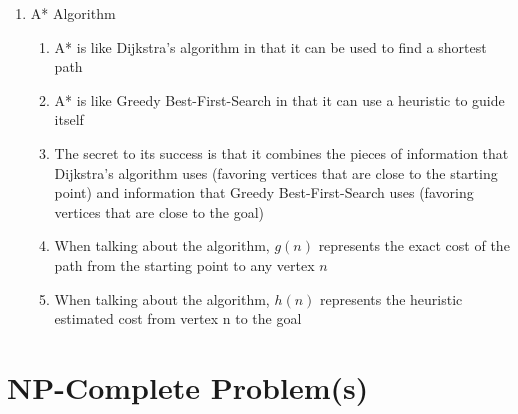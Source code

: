 \documentclass [12pt, executivepaper]{article}
\begin{document}
\begin{enumerate}
\begin{enumerate}
\begin{enumerate}
\end{enumerate}

\item A* Algorithm

\begin{enumerate}

\item A* is like Dijkstra's algorithm in that it can be used to find a shortest path

\item A* is like Greedy Best-First-Search in that it can use a heuristic to guide itself

\item The secret to its success is that it combines the pieces of information that Dijkstra's algorithm uses (favoring vertices that are close to the starting point) and information that Greedy Best-First-Search uses (favoring vertices that are close to the goal)

\item When talking about the algorithm, $g(n)$ represents the exact cost of the path from the starting point to any vertex $n$

\item When talking about the algorithm, $h(n)$ represents the heuristic estimated cost from vertex n to the goal

\end{enumerate}

\end{enumerate}

\end{enumerate}

\section*{NP-Complete Problem(s)}
\end{document}
